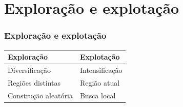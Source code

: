 \documentclass[fleqn]{beamer}
\begin{document}
\section{Exploração e explotação}

\begin{frame}
	\frametitle{Exploração e explotação}
	\begin{center}
	\begin{tabular}{p{}p{}}
		\toprule
		\textbf{Exploração} & \textbf{Explotação} \\
		\midrule
		Diversificação & Intensificação \\
		Regiões distintas & Região atual \\
		Construção aleatória & Busca local \\
		\bottomrule
	\end{tabular}
	\end{center}
\end{frame}

\newcommand{\terreno}[1]{%
	\fill[brown!20] (0,0) rectangle (6.4,-3.0);
	\draw[thick,brown!60!black] (0,0) -- (6.4,0);
	\fill[yellow!70!orange,draw=orange!70!black] (1.0,-1.5) ellipse (0.45 and 0.3);
	\fill[yellow!80!orange,draw=orange!70!black] (3.3,-2.0) ellipse (0.9 and 0.5);
	\fill[yellow!70!orange,draw=orange!70!black] (5.4,-1.2) ellipse (0.6 and 0.35);
	#1
}
\end{document}
